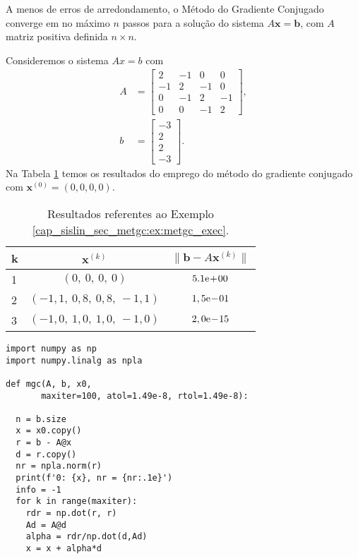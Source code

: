 \begin{obs}
  A menos de erros de arredondamento, o Método do Gradiente Conjugado converge em no máximo $n$ passos para a solução do sistema $A\pmb{x} = \pmb{b}$, com $A$ matriz positiva definida $n\times n$.
\end{obs}


\begin{ex}\label{cap_sislin_sec_metgc:ex:metgc_exec}
  Consideremos o sistema $Ax = b$ com
  \begin{align}
    A &=
    \begin{bmatrix}
      2 & -1 & 0 & 0\\
      -1 & 2 & -1 & 0\\
      0 & -1 & 2 & -1 \\
      0 & 0 & -1 & 2
    \end{bmatrix},\\
    b &=
    \begin{bmatrix}
      -3\\
      2\\
      2\\
      -3
    \end{bmatrix}.
  \end{align}
  Na Tabela \ref{cap_sislin_sec_metgc:tab:metgc_exec} temos os resultados do emprego do método do gradiente conjugado com $\pmb{x}^{(0)} = (0, 0, 0, 0)$.

  \begin{table}[H]
    \centering
    \caption{Resultados referentes ao Exemplo \ref{cap_sislin_sec_metgc:ex:metgc_exec}.}
    \label{cap_sislin_sec_metgc:tab:metgc_exec}
    \begin{tabular}{l|c|c}
      k & $\pmb{x}^{(k)}$ & $\|\pmb{b}-A\pmb{x}^{(k)}\|$\\\hline
      1 & $(0,~0,~0,~0)$ & $5.1\mathrm{e}\!+\!00$\\
      2 & $(-1,1,~0,8,~0,8,~-1,1)$ & $1,5\mathrm{e}\!-\!01$\\
      3 & $(-1,0,~1,0,~1,0,~-1,0)$ & $2,0\mathrm{e}\!-\!15$\\\hline
    \end{tabular}
  \end{table}

\begin{lstlisting}[caption=mgc.py, label=cap_sislin_sec_metgc:cod:mgc.py]
import numpy as np
import numpy.linalg as npla

def mgc(A, b, x0,
       maxiter=100, atol=1.49e-8, rtol=1.49e-8):
    
  n = b.size
  x = x0.copy()
  r = b - A@x
  d = r.copy()
  nr = npla.norm(r)
  print(f'0: {x}, nr = {nr:.1e}')
  info = -1
  for k in range(maxiter):
    rdr = np.dot(r, r)
    Ad = A@d
    alpha = rdr/np.dot(d,Ad)
    x = x + alpha*d


\end{lstlisting}
\end{ex}
